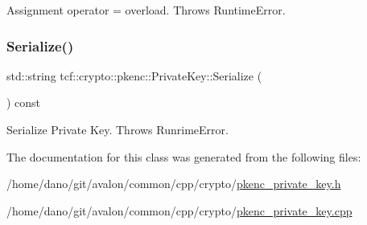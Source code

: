 Assignment operator = overload. Throws Runtime\+Error. \mbox{\label{classtcf_1_1crypto_1_1pkenc_1_1PrivateKey_a56f53348e7b2e88c7c2eb4cc839727b2}} 
\subsubsection{\texorpdfstring{Serialize()}{Serialize()}}
{\footnotesize\ttfamily std\+::string tcf\+::crypto\+::pkenc\+::\+Private\+Key\+::\+Serialize (\begin{DoxyParamCaption}{ }\end{DoxyParamCaption}) const}

Serialize Private Key. Throws Runrime\+Error. 

The documentation for this class was generated from the following files\+:\begin{DoxyCompactItemize}
\item 
/home/dano/git/avalon/common/cpp/crypto/\hyperlink{pkenc__private__key_8h}{pkenc\+\_\+private\+\_\+key.\+h}\item 
/home/dano/git/avalon/common/cpp/crypto/\hyperlink{pkenc__private__key_8cpp}{pkenc\+\_\+private\+\_\+key.\+cpp}\end{DoxyCompactItemize}
